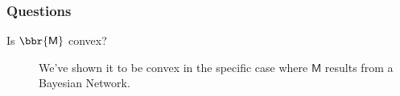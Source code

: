 \documentclass{article}
\newcommand{\sfM}{\mathsf M}
\begin{document}
	\subsubsection*{Questions}
	\begin{description}
		\item [Is $\bbr{\sfM}$ convex?] We've shown it to be convex in the specific case where $\sfM$ results from a Bayesian Network.
	\end{description}

\end{document}
